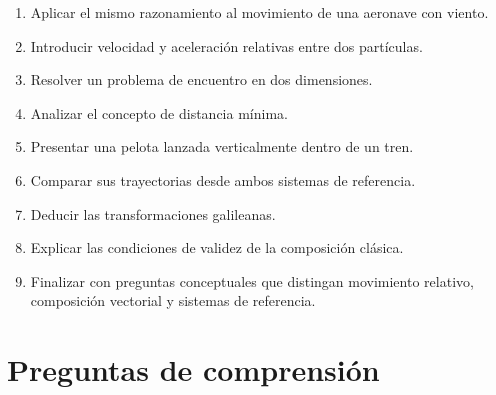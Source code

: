 \begin{notapedagogica}
\begin{enumerate}
    \item Aplicar el mismo razonamiento
    al movimiento de una aeronave con viento.

    \item Introducir velocidad y aceleración
    relativas entre dos partículas.

    \item Resolver un problema de encuentro
    en dos dimensiones.

    \item Analizar el concepto
    de distancia mínima.

    \item Presentar una pelota lanzada
    verticalmente dentro de un tren.

    \item Comparar sus trayectorias
    desde ambos sistemas de referencia.

    \item Deducir las transformaciones
    galileanas.

    \item Explicar las condiciones
    de validez de la composición clásica.

    \item Finalizar con preguntas conceptuales
    que distingan movimiento relativo,
    composición vectorial y sistemas
    de referencia.

\end{enumerate}

\end{notapedagogica}


\section{Preguntas de comprensión}

